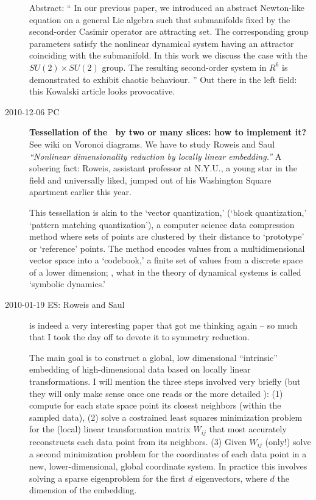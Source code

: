 \begin{description}
Abstract: ``
In our previous paper, we introduced an abstract Newton-like equation on a general Lie algebra such that submanifolds fixed by the second-order Casimir operator are attracting set. The corresponding group parameters satisfy the nonlinear dynamical system having an attractor coinciding with the submanifold. In this work we discuss the case with the $SU(2)\times SU(2)$ group. The resulting second-order system in $R^6$ is demonstrated to exhibit chaotic behaviour.
''
Out there in the left field: this Kowalski article
looks provocative.

  \item[2010-12-06 PC]
{\bf Tessellation of the \reducedsp\ by two or many slices:
how to implement it?}
See 
{wiki on Voronoi diagrams}.
We have to study Roweis  and Saul
\emph{``Nonlinear dimensionality reduction by locally linear embedding.''}
A sobering fact: Roweis, assistant professor at N.Y.U., a young
star in the field and universally liked, jumped out of his Washington
Square apartment earlier this year.

 This tessellation is akin to the
{`vector quantization,'} (`block quantization,'  `pattern matching quantization'),
a computer science data compression method where sets of points are
clustered by their distance to `prototype' or `reference' points. The
method encodes values from a multidimensional vector space into a
`codebook,' a finite set of values from a discrete space of a lower
dimension; \ie, what in the theory of dynamical systems is called
`symbolic dynamics.'


 \item[2010-01-19 ES: Roweis and Saul\rf{RoSa00}] is indeed a very interesting
  paper that got me thinking again -- so much that I took the day off to devote
  it to symmetry reduction.

  The main goal is to construct a global, low dimensional ``intrinsic''
  embedding of high-dimensional data based on locally linear transformations.
  I will mention the three steps involved very briefly (but they will only make
  sense once one reads  or the more detailed ):
  (1) compute for each state space point its
  closest neighbors (within the sampled data), (2) solve a costrained
  least squares minimization problem for the (local) linear transformation
  matrix $W_{ij}$ that most accurately reconstructs each data point
  from its neighbors. (3) Given $W_{ij}$ (only!) solve a second minimization
  problem for the coordinates of each data point in a new, lower-dimensional,
  global coordinate system. In practice this involves solving a sparse
  eigenproblem for the first $d$ eigenvectors, where $d$ the dimension of
  the embedding.


\end{description}
